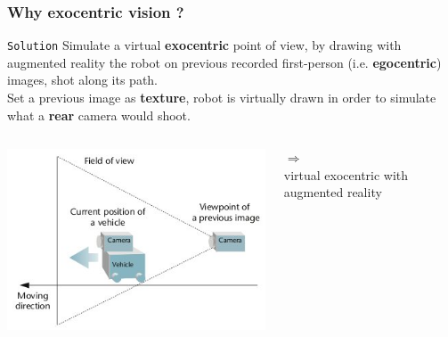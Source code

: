 \frame
{
  \frametitle{Why exocentric vision ?}

  \begin{block} {\alert{\texttt{Solution}}}
    Simulate a virtual \textbf{exocentric} point of view, by drawing with augmented reality
    the robot on previous recorded first-person (i.e. \textbf{egocentric}) images, shot along its path. \\
    \pause
    Set a previous image as \textbf{texture}, robot is virtually drawn in order to
    simulate what a \textbf{rear} camera would shoot.  
  \end{block}

  \pause
  
  \begin{columns}
    
     {
      \includegraphics[width=\textwidth]{img/exocentric_vision.jpg}
    }

    \pause
    
     {
      \begin{center}
        $\Longrightarrow$ \\
        \alert{virtual exocentric}
        \vskip4pt
        \scriptsize{with augmented reality}
      \end{center}
    }

    \pause


\end{columns}}
